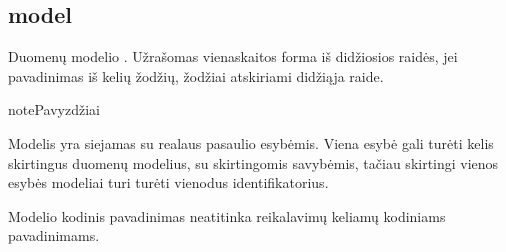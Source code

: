 \documentclass[letterpaper,10pt,lithuanian]{sphinxmanual}
\begin{document}
\subsection{model}
\label{\detokenize{dimensijos:model}}\label{\detokenize{dimensijos:id5}}\label{\detokenize{dimensijos:module-model}}
\sphinxAtStartPar
Duomenų modelio {\hyperref[\detokenize{pavadinimai:kodiniai-pavadinimai}]{}}. Užrašomas
vienaskaitos forma iš didžiosios raidės, jei pavadinimas iš kelių žodžių,
žodžiai atskiriami didžiąja raide.

\begin{sphinxadmonition}{note}{Pavyzdžiai}

\begin{DUlineblock}{0em}
\item[] 
\item[] 
\end{DUlineblock}
\end{sphinxadmonition}

\sphinxAtStartPar
Modelis yra siejamas su realaus pasaulio esybėmis. Viena esybė gali turėti
kelis skirtingus duomenų modelius, su skirtingomis savybėmis, tačiau skirtingi
vienos esybės modeliai turi turėti vienodus identifikatorius.

\begin{sphinxShadowBox}
\begin{description}
\sphinxAtStartPar
Modelio kodinis pavadinimas neatitinka reikalavimų keliamų kodiniams
pavadinimams.

\end{description}
\end{sphinxShadowBox}
\end{document}
